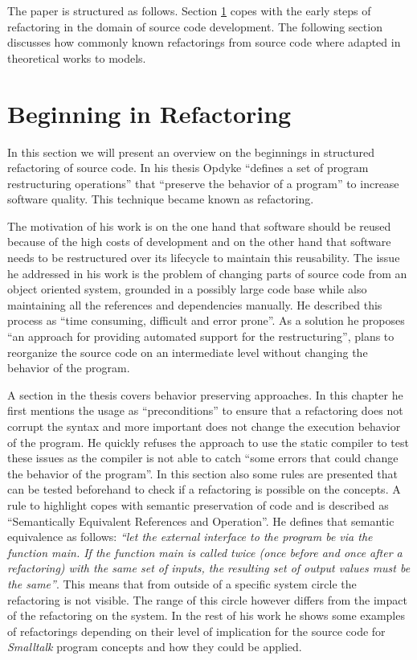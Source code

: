 \documentclass{llncs}
\begin{document}
The paper is structured as follows. Section \ref{sec:beginning} copes with the early steps of refactoring in the domain of source code development. The following section discusses how commonly known refactorings from source code where adapted in theoretical works to models.

\section{Beginning in Refactoring}
\label{sec:beginning}

In this section we will present an overview on the beginnings in structured refactoring of source code. In his thesis \cite{mast:REFOOF} Opdyke ``defines a set of program restructuring operations'' that ``preserve the behavior of a program'' to increase software quality. This technique became known as refactoring.

The motivation of his work is on the one hand that software should be reused because of the high costs of development and on the other hand that software needs to be restructured over its lifecycle to maintain this reusability. The issue he addressed in his work is the problem of changing parts of source code from an object oriented system, grounded in a possibly large code base while also maintaining all the references and dependencies manually. He described this process as ``time consuming, difficult and error prone''. As a solution he proposes ``an approach for providing automated support for the restructuring'', plans to reorganize the source code on an intermediate level without changing the behavior of the program.

A section in the thesis covers behavior preserving approaches. In this chapter he first mentions the usage as ``preconditions'' to ensure that a refactoring does not corrupt the syntax and more important does not change the execution behavior of the program. He quickly refuses the approach to use the static compiler to test these issues as the compiler is not able to catch ``some errors that could change the behavior of the program''. In this section also some rules are presented that can be tested beforehand to check if a refactoring is possible on the concepts. A rule to highlight copes with semantic preservation of code and is described as ``Semantically Equivalent References and Operation''. He defines that semantic equivalence as follows: \textit{``let the external interface to the program be via the function main. If the function main is called twice (once before and once after a refactoring) with the same set of inputs, the resulting set of output values must be the same''}. This means that from outside of a specific system circle the refactoring is not visible. The range of this circle however differs from the impact of the refactoring on the system. In the rest of his work he shows some examples of refactorings depending on their level of implication for the source code for \textit{Smalltalk} program concepts and how they could be applied.
\end{document}

